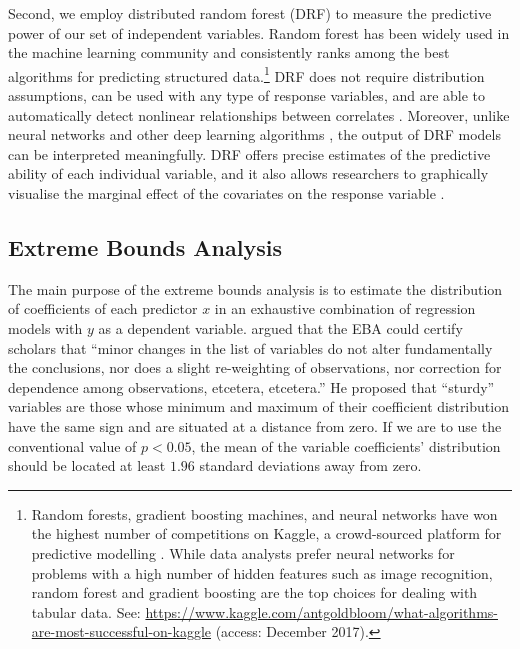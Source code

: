 Second, we employ distributed random forest (DRF) \citep{breiman2001random, h2o2017} to measure the predictive power of our set of independent variables. Random forest has been widely used in the machine learning community and consistently ranks among the best algorithms for predicting structured data.\footnote{Random forests, gradient boosting machines, and neural networks have won the highest number of competitions on Kaggle, a crowd-sourced platform for predictive modelling \citep{carpenter2011may}. While data analysts prefer neural networks for problems with a high number of hidden features such as image recognition, random forest and gradient boosting are the top choices for dealing with tabular data. See: \href{https://www.kaggle.com/antgoldbloom/what-algorithms-are-most-successful-on-kaggle}{https://www.kaggle.com/antgoldbloom/what-algorithms-are-most-successful-on-kaggle} (access: December 2017).} DRF does not require distribution assumptions, can be used with any type of response variables, and are able to automatically detect nonlinear relationships between correlates \citep{fernandez2014we, hill2014empirical, jones2015exploratory, muchlinski2015comparing}. Moreover, unlike neural networks and other deep learning algorithms \citep{castelvecchi2016can,rojas2013neural,shwartz2017opening}, the output of DRF models can be interpreted meaningfully. DRF offers precise estimates of the predictive ability of each individual variable, and it also allows researchers to graphically visualise the marginal effect of the covariates on the response variable \citep{friedman2001greedy,friedman2001elements,goldstein2015peeking}.


\subsection{Extreme Bounds Analysis}
\label{subsec:eba}

The main purpose of the extreme bounds analysis is to estimate the distribution of coefficients of each predictor $x$ in an exhaustive combination of regression models with $y$ as a dependent variable. \cite[308]{leamer1985sensitivity} argued that the EBA could certify scholars that ``minor changes in the list of variables do not alter fundamentally the conclusions, nor does a slight re-weighting of observations, nor correction for dependence among observations, etcetera, etcetera.'' He proposed that ``sturdy'' variables are those whose minimum and maximum of their coefficient distribution have the same sign and are situated at a distance from zero. If we are to use the conventional value of $p < 0.05$, the mean of the variable coefficients' distribution should be located at least $1.96$ standard deviations away from zero. 

